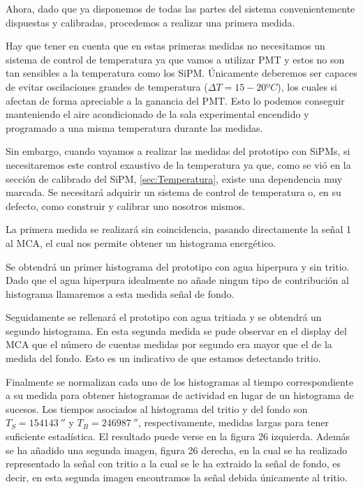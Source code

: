 Ahora, dado que ya disponemos de todas las partes del sistema convenientemente dispuestas y calibradas, procedemos a realizar una primera medida.

Hay que tener en cuenta que en estas primeras medidas no necesitamos un sistema de control de temperatura ya que vamos a utilizar PMT y estos no son tan sensibles a la temperatura como los SiPM. Únicamente deberemos ser capaces de evitar oscilaciones grandes de temperatura ($\Delta T=15-20ºC$), los cuales si afectan de forma apreciable a la ganancia del PMT. Esto lo podemos conseguir manteniendo el aire acondicionado de la sala experimental encendido y programado a una misma temperatura durante las medidas. 

Sin embargo, cuando vayamos a realizar las medidas del prototipo con SiPMs, si necesitaremos este control exaustivo de la temperatura ya que, como se vió en la sección de calibrado del SiPM, \ref{sec:Temperatura}, existe una dependencia muy marcada. Se necesitará adquirir un sistema de control de temperatura o, en su defecto, como construir y calibrar uno nosotros mismos.

La primera medida se realizará sin coincidencia, pasando directamente la señal 1 al MCA, el cual nos permite obtener un histograma energético.

Se obtendrá un primer histograma del prototipo con agua hiperpura y sin tritio. Dado que el agua hiperpura idealmente no añade ningun tipo de contribución al histograma llamaremos a esta medida señal de fondo. 

Seguidamente se rellenará el prototipo con agua tritiada y se obtendrá un segundo histograma. En esta segunda medida se pude observar en el display del MCA que el número de cuentas medidas por segundo era mayor que el de la medida del fondo. Esto es un indicativo de que estamos detectando tritio. 

Finalmente se normalizan cada uno de los histogramas al tiempo correspondiente a su medida para obtener histogramas de actividad en lugar de un histograma de sucesos. Los tiempos asociados al histograma del tritio y del fondo son $T_S=154143~\second$  y $T_B=246987~\second$, respectivamente, medidas largas para tener suficiente estadística. El resultado puede verse en la figura 26 izquierda. Además se ha añadido una segunda imagen, figura 26 derecha, en la cual se ha realizado representado la señal con tritio a la cual se le ha extraido la señal de fondo, es decir, en esta segunda imagen encontramos la señal debida únicamente al tritio.

